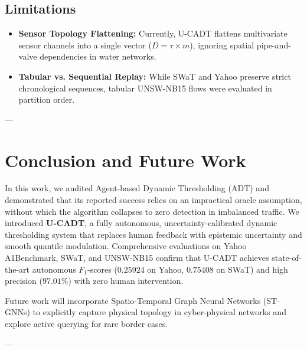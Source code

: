 \documentclass[conference]{IEEEtran}
\begin{document}
\subsection{Limitations}
\begin{itemize}
    \item \textbf{Sensor Topology Flattening:} Currently, U-CADT flattens multivariate sensor channels into a single vector ($D = \tau \times m$), ignoring spatial pipe-and-valve dependencies in water networks.
    \item \textbf{Tabular vs. Sequential Replay:} While SWaT and Yahoo preserve strict chronological sequences, tabular UNSW-NB15 flows were evaluated in partition order.
\end{itemize}

---

\section{Conclusion and Future Work}
In this work, we audited Agent-based Dynamic Thresholding (ADT) and demonstrated that its reported success relies on an impractical oracle assumption, without which the algorithm collapses to zero detection in imbalanced traffic. We introduced \textbf{U-CADT}, a fully autonomous, uncertainty-calibrated dynamic thresholding system that replaces human feedback with epistemic uncertainty and smooth quantile modulation. Comprehensive evaluations on Yahoo A1Benchmark, SWaT, and UNSW-NB15 confirm that U-CADT achieves state-of-the-art autonomous $F_1$-scores ($0.25924$ on Yahoo, $0.75408$ on SWaT) and high precision ($97.01\%$) with zero human intervention.

Future work will incorporate Spatio-Temporal Graph Neural Networks (ST-GNNs) to explicitly capture physical topology in cyber-physical networks and explore active querying for rare border cases.

---
\end{document}
